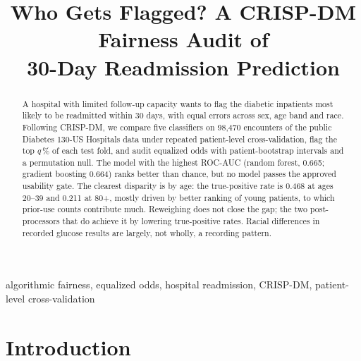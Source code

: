 \documentclass[conference]{IEEEtran}
\begin{document}
\title{Who Gets Flagged? A CRISP-DM Fairness Audit of\\ 30-Day Readmission Prediction}

\author{
}

\maketitle

\begin{abstract}
A hospital with limited follow-up capacity wants to flag the diabetic inpatients most likely to
be readmitted within 30 days, with equal errors across sex, age band and race. Following CRISP-DM,
we compare five classifiers on 98,470 encounters of the public Diabetes 130-US Hospitals data
under repeated patient-level cross-validation, flag the top $q$\,\% of each test fold, and audit
equalized odds with patient-bootstrap intervals and a permutation null. %
The model with the highest ROC-AUC (random forest, 0.665; gradient boosting 0.664) ranks better
than chance, but no model passes the approved usability gate. %
The clearest disparity is by age: the true-positive rate is 0.468 at ages 20--39 and 0.211 at
80+, mostly driven by better ranking of young patients, to which prior-use counts contribute much.
Reweighing does not close the gap; the two post-processors that do achieve it by lowering
true-positive rates. %
Racial differences in recorded glucose results are largely, not wholly, a recording pattern. %
\end{abstract}

\begin{IEEEkeywords}
algorithmic fairness, equalized odds, hospital readmission, CRISP-DM, patient-level
cross-validation
\end{IEEEkeywords}

\section{Introduction}
\end{document}
